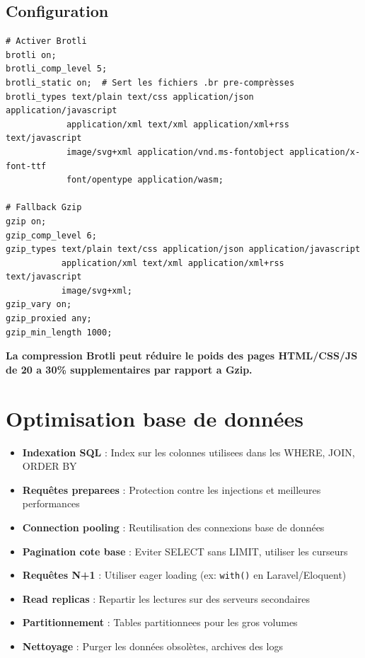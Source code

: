 \documentclass[12pt,a4paper,twoside]{report}
\newcommand{\important}[1]{\textbf{\textcolor{googlered}{#1}}}
\begin{document}
\subsection{Configuration}

\begin{lstlisting}[style=code,caption={Configuration NGINX pour Brotli et Gzip}]
# Activer Brotli
brotli on;
brotli_comp_level 5;
brotli_static on;  # Sert les fichiers .br pre-comprèsses
brotli_types text/plain text/css application/json application/javascript
            application/xml text/xml application/xml+rss text/javascript
            image/svg+xml application/vnd.ms-fontobject application/x-font-ttf
            font/opentype application/wasm;

# Fallback Gzip
gzip on;
gzip_comp_level 6;
gzip_types text/plain text/css application/json application/javascript
           application/xml text/xml application/xml+rss text/javascript
           image/svg+xml;
gzip_vary on;
gzip_proxied any;
gzip_min_length 1000;
\end{lstlisting}

\important{La compression Brotli peut réduire le poids des pages HTML/CSS/JS de 20 a 30\% supplementaires par rapport a Gzip.}

\section{Optimisation base de données}

\begin{itemize}
    \item \textbf{Indexation SQL} : Index sur les colonnes utilisees dans les WHERE, JOIN, ORDER BY
    \item \textbf{Requêtes preparees} : Protection contre les injections et meilleures performances
    \item \textbf{Connection pooling} : Reutilisation des connexions base de données
    \item \textbf{Pagination cote base} : Eviter SELECT sans LIMIT, utiliser les curseurs
    \item \textbf{Requêtes N+1} : Utiliser eager loading (ex: \texttt{with()} en Laravel/Eloquent)
    \item \textbf{Read replicas} : Repartir les lectures sur des serveurs secondaires
    \item \textbf{Partitionnement} : Tables partitionnees pour les gros volumes
    \item \textbf{Nettoyage} : Purger les données obsolètes, archives des logs
\end{itemize}
\end{document}
